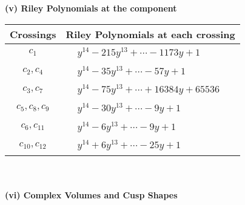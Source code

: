 \documentclass[1p]{elsarticle_modified}
\theoremstyle{definition}
\begin{document}
\newpage\renewcommand{\arraystretch}{1}
\flushleft \textbf{(v) Riley Polynomials at the component}\newline \\
\begin{tabular}{m{50pt}|m{274pt}}
Crossings & \hspace{64pt}Riley Polynomials at each crossing \\
\hline $$\begin{aligned}c_{1}\end{aligned}$$&$\begin{aligned}
&y^{14}-215 y^{13}+\cdots-1173 y+1
\end{aligned}$\\
\hline $$\begin{aligned}c_{2},c_{4}\end{aligned}$$&$\begin{aligned}
&y^{14}-35 y^{13}+\cdots-57 y+1
\end{aligned}$\\
\hline $$\begin{aligned}c_{3},c_{7}\end{aligned}$$&$\begin{aligned}
&y^{14}-75 y^{13}+\cdots+16384 y+65536
\end{aligned}$\\
\hline $$\begin{aligned}c_{5},c_{8},c_{9}\end{aligned}$$&$\begin{aligned}
&y^{14}-30 y^{13}+\cdots-9 y+1
\end{aligned}$\\
\hline $$\begin{aligned}c_{6},c_{11}\end{aligned}$$&$\begin{aligned}
&y^{14}-6 y^{13}+\cdots-9 y+1
\end{aligned}$\\
\hline $$\begin{aligned}c_{10},c_{12}\end{aligned}$$&$\begin{aligned}
&y^{14}+6 y^{13}+\cdots-25 y+1
\end{aligned}$\\
\hline
\end{tabular}\\~\\
\newpage\flushleft \textbf{(vi) Complex Volumes and Cusp Shapes}
\end{document}
